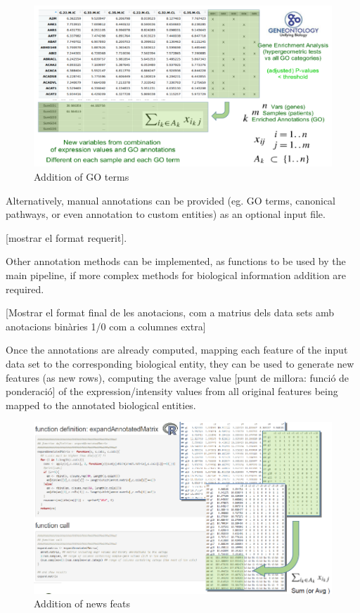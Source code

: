 \documentclass[a4paper, nobind]{templates/ociamthesis}
\begin{document}
\begin{figure}

{\centering \includegraphics[width=0.95\linewidth]{figures/chapter3/3-1_addition_of_GO_terms} 

}

\caption{Addition of GO terms}\label{fig:fig3-1}
\end{figure}

Alternatively, manual annotations can be provided (eg. GO terms, canonical pathways, or even annotation to custom entities) as an optional input file.

{[}mostrar el format requerit{]}.

Other annotation methods can be implemented, as functions to be used by the main pipeline, if more complex methods for biological information addition are required.

{[}Mostrar el format final de les anotacions, com a matrius dels data sets amb anotacions binàries 1/0 com a columnes extra{]}

Once the annotations are already computed, mapping each feature of the input data set to the corresponding biological entity, they can be used to generate new features (as new rows), computing the average value {[}punt de millora: funció de ponderació{]} of the expression/intensity values from all original features being mapped to the annotated biological entities.

\begin{figure}

{\centering \includegraphics[width=0.95\linewidth]{figures/chapter3/3-2_addition_of_new_feats} 

}

\caption{Addition of news feats}\label{fig:fig3-2}
\end{figure}
\end{document}
